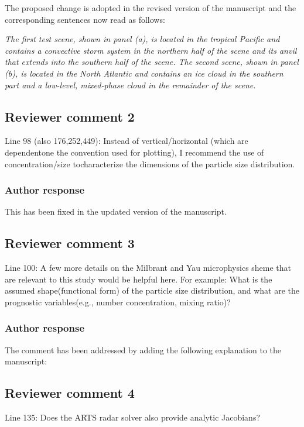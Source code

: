 \documentclass[11pt]{scrartcl}
\begin{document}
The proposed change is adopted in the revised version of the manuscript and the corresponding
sentences now read as follows:

\textit{
The first test scene, shown in panel (a), is located in the
tropical Pacific and contains a convective storm system in the northern half of
the scene and its anvil that extends into the southern half of the scene. The
second scene, shown in panel (b), is located in the North Atlantic and contains
an ice cloud in the southern part and a low-level, mixed-phase cloud in the
remainder of the scene.
}



\subsection*{Reviewer comment 2}
Line  98  (also  176,252,449):  Instead  of  vertical/horizontal  (which  are  dependentone the convention used for plotting), I recommend the use of concentration/size tocharacterize the dimensions of the particle size distribution.

\subsubsection*{Author response}
This has been fixed in the updated version of the manuscript.

\subsection*{Reviewer comment 3}

Line 100: A few more details on the Milbrant and Yau microphysics sheme that are relevant to this study would be helpful here. For example: What is the assumed shape(functional form) of the particle size distribution, and what are the prognostic variables(e.g., number concentration, mixing ratio)?

\subsubsection*{Author response}

The comment has been addressed by adding the following explanation to the manuscript:


\subsection*{Reviewer comment 4}
Line 135: Does the ARTS radar solver also provide analytic Jacobians?
\end{document}
